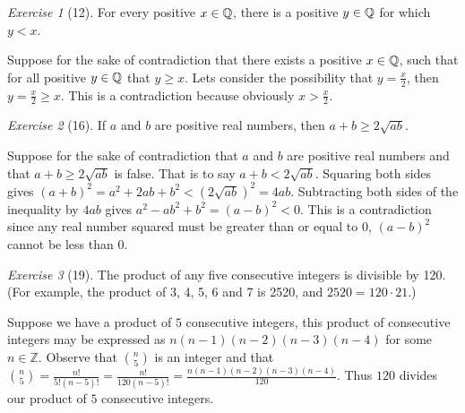 \documentclass[12pt]{amsart}
\makeatletter
\theoremstyle{remark}
\newtheorem*{exercise}{Exercise}%
\def\ZZ{\ensuremath{\mathbb Z}}
\def\QQ{{\ensuremath\mathbb Q}}
\renewenvironment{proof}[1][\proofname]{\par\doublespacing
  \pushQED{\qed}%
  \normalfont \topsep6\p@\@plus6\p@\relax
  \list{}{%
    \settowidth{\leftmargin}{\itshape\proofname:\hskip\labelsep}%
    \setlength{\labelwidth}{0pt}%
    \setlength{\itemindent}{-\leftmargin}%
  }%
  \item[\hskip\labelsep\itshape#1\@addpunct{:}]\ignorespaces
}{%
  \popQED\endlist\@endpefalse
  \singlespacing
}
\theoremstyle{mycomment}
\makeatother
\begin{document}
\begin{exercise}[12] For every positive $x\in\QQ$, there is a positive $y\in\QQ$ for which $y<x$.
\begin{proof}
  Suppose for the sake of contradiction that there exists a positive $x\in\QQ$, such that for all positive $y\in\QQ$ that $y \geq x$. Lets consider the possibility that $ y = \frac{x}{2}$, then $y = \frac{x}{2} \geq x$. This is a contradiction because obviously $x > \frac{x}{2}$.
\end{proof}
\end{exercise}

\begin{exercise}[16] If $a$ and $b$ are positive real numbers, then $a+b\ge 2\sqrt{ab}$.
\begin{proof}
  Suppose for the sake of contradiction that $a$ and $b$ are positive real numbers and that $a+b\ge 2\sqrt{ab}$ is false. That is to say $a+b < 2\sqrt{ab}$. Squaring both sides gives $(a + b)^2 = a^2 + 2ab + b^2 < (2\sqrt{ab})^2 = 4ab$. Subtracting both sides of the inequality by $4ab$ gives $a^2 - ab^2 + b^2 = (a-b)^2 < 0$. This is a contradiction since any real number squared must be greater than or equal to $0$, $(a-b)^2$ cannot be less than $0$.
\end{proof}
\end{exercise}

\begin{exercise}[19] The product of any five consecutive integers is divisible by 120. (For example, the product of 3, 4, 5, 6 and 7 is 2520, and $2520=120\cdot 21$.)
\begin{proof}
  Suppose we have a product of $5$ consecutive integers, this product of consecutive integers may be expressed as $n(n-1)(n-2)(n-3)(n-4)$ for some $n\in\ZZ$. Observe that $\binom{n}{5}$ is an integer and that $\binom{n}{5} = \frac{n!}{5!(n-5)!} = \frac{n!}{120(n-5)!} = \frac{n(n-1)(n-2)(n-3)(n-4)}{120}$. Thus $120$ divides our product of $5$ consecutive integers.
\end{proof}
\end{exercise}
\end{document}
